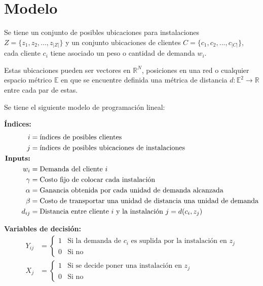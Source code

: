 \section{Modelo}



Se tiene un conjunto de posibles ubicaciones para instalaciones $Z = \{z_1,z_2,...,z_{|Z|}\}$ y un conjunto ubicaciones de clientes $C = \{c_1,c_2,...,c_{|C|}\}$, cada cliente $c_i$ tiene asociado un peso o cantidad de demanda $w_i$.

Estas ubicaciones pueden ser vectores en $\mathbb{R}^N$, posiciones en una red o cualquier espacio métrico $\mathbb{E}$ en que se encuentre definida una métrica de distancia $d : \mathbb{E}^2 \rightarrow \mathbb{R}$ entre cada par de estas.

Se tiene el siguiente modelo de programación lineal:

\textbf{Índices:}
\begin{align*}
    i &= \text{índices de posibles clientes} \\
    j &= \text{índices de posibles ubicaciones de instalaciones} \\
    \text{\textbf{Inputs:}} \\
    w_i &= \text{Demanda del cliente $i$} \\
    \gamma &= \text{Costo fijo de colocar cada instalación} \\
    \alpha &= \text{Ganancia obtenida por cada unidad de demanda alcanzada} \\
    \beta &= \text{Costo de transportar una unidad de distancia una unidad de demanda} \\
    d_{ij} &= \text{Distancia entre cliente $i$ y la instalación $j$} = d(c_i,z_j)
\end{align*}

\textbf{Variables de decisión:}
\begin{align*}
    Y_{ij} &= \begin{cases}
        1 & \text{Si la demanda de $c_i$ es suplida por la instalación en $z_j$} \\
        0 & \text{Si no}
    \end{cases} \\
    X_{j} &= \begin{cases}
        1 & \text{Si se decide poner una instalación en $z_j$} \\
        0 & \text{Si no}
    \end{cases}
\end{align*}

